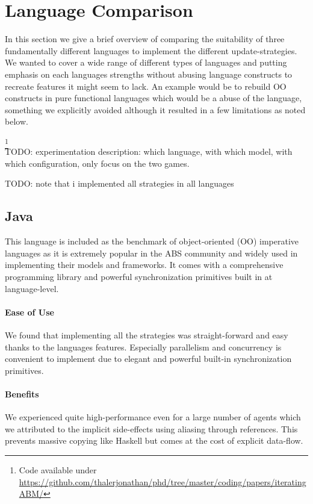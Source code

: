 \section{Language Comparison}
In this section we give a brief overview of comparing the suitability of three fundamentally different languages to implement the different update-strategies. We wanted to cover a wide range of different types of languages and putting emphasis on each languages strengths without abusing language constructs to recreate features it might seem to lack. An example would be to rebuild OO constructs in pure functional languages which would be a abuse of the language, something we explicitly avoided although it resulted in a few limitations as noted below.

\footnote{Code available under\\ \url{https://github.com/thalerjonathan/phd/tree/master/coding/papers/iteratingABM/}}\\

TODO: experimentation description: which language, with which model, with which configuration, only focus on the two games.

TODO: note that i implemented all strategies in all languages

\subsection{Java}
This language is included as the benchmark of object-oriented (OO) imperative languages as it is extremely popular in the ABS community and widely used in implementing their models and frameworks. It comes with a comprehensive programming library and powerful synchronization primitives built in at language-level.

\paragraph{Ease of Use}
We found that implementing all the strategies was straight-forward and easy thanks to the languages features. Especially parallelism and concurrency is convenient to implement due to elegant and powerful built-in synchronization primitives.

\paragraph{Benefits}
We experienced quite high-performance even for a large number of agents which we attributed to the implicit side-effects using aliasing through references. This prevents massive copying like Haskell but comes at the cost of explicit data-flow.

